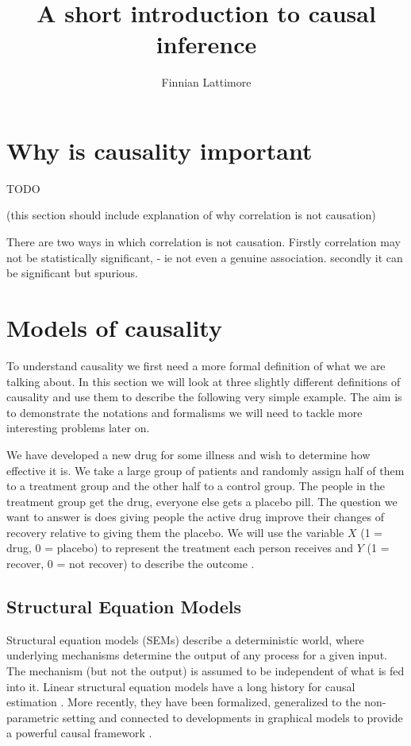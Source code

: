 \documentclass[11pt,a4paper]{article}
\author{Finnian Lattimore}
\title{A short introduction to causal inference}
\begin{document}
\def\ci{\perp\!\!\!\perp} %
\newtheorem{theorem}{Theorem}[section]
\newtheorem{definition}{Definition}[section]

\section{Why is causality important}

TODO

(this section should include explanation of why correlation is not causation)

There are two ways in which correlation is not causation. Firstly correlation may not be statistically significant, - ie not even a genuine association. secondly it can be significant but spurious. 


\section{Models of causality}
\label{sec:causalmodels}
To understand causality we first need a more formal definition of what we are talking about. In this section we will look at three slightly different definitions of causality and use them to describe the following very simple example. The aim is to demonstrate the notations and formalisms we will need to tackle more interesting problems later on.

We have developed a new drug for some illness and wish to determine how effective it is. We take a large group of patients and randomly assign half of them to a treatment group and the other half to a control group. The people in the treatment group get the drug, everyone else gets a placebo pill. The question we want to answer is does giving people the active drug improve their changes of recovery relative to giving them the placebo. We will use the variable $X$ (1 = drug, 0 = placebo) to represent the treatment each person receives and $Y$ (1 = recover, 0 = not recover) to describe the outcome .
\subsection{Structural Equation Models}

Structural equation models (SEMs) describe a deterministic world, where underlying mechanisms determine the output of any process for a given input. The mechanism (but not the output) is assumed to be independent of what is fed into it. Linear structural equation models have a long history for causal estimation \cite {Wright1921,Haavelmo1943}. More recently, they have been formalized, generalized to the non-parametric setting and connected to developments in graphical models to provide a powerful causal framework \cite{Pearl2000}.
\end{document}

